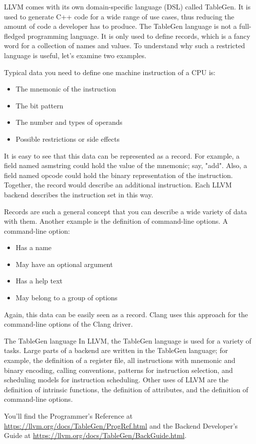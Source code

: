 LLVM comes with its own domain-specific language (DSL) called TableGen. It is used to generate C++ code for a wide range of use cases, thus reducing the amount of code a developer has to produce. The TableGen language is not a full-fledged programming language. It is only used to define records, which is a fancy word for a collection of names and values. To understand why such a restricted language is useful, let’s examine two examples.

Typical data you need to define one machine instruction of a CPU is:

\begin{itemize}
\item
The mnemonic of the instruction

\item
The bit pattern

\item
The number and types of operands

\item
Possible restrictions or side effects
\end{itemize}

It is easy to see that this data can be represented as a record. For example, a field named asmstring could hold the value of the mnemonic; say, "add". Also, a field named opcode could hold the binary representation of the instruction. Together, the record would describe an additional instruction. Each LLVM backend describes the instruction set in this way.

Records are such a general concept that you can describe a wide variety of data with them. Another example is the definition of command-line options. A command-line option:

\begin{itemize}
\item
Has a name

\item
May have an optional argument

\item
Has a help text

\item
May belong to a group of options
\end{itemize}

Again, this data can be easily seen as a record. Clang uses this approach for the command-line options of the Clang driver.

\begin{myTip}{The TableGen language}
In LLVM, the TableGen language is used for a variety of tasks. Large parts of a backend are written in the TableGen language; for example, the definition of a register file, all instructions with mnemonic and binary encoding, calling conventions, patterns for instruction selection, and scheduling models for instruction scheduling. Other uses of LLVM are the definition of intrinsic functions, the definition of attributes, and the definition of command-line options.

You’ll find the Programmer’s Reference at \url{https://llvm.org/docs/TableGen/ProgRef.html} and the Backend Developer’s Guide at \url{https://llvm.org/docs/TableGen/BackGuide.html}.
\end{myTip}

